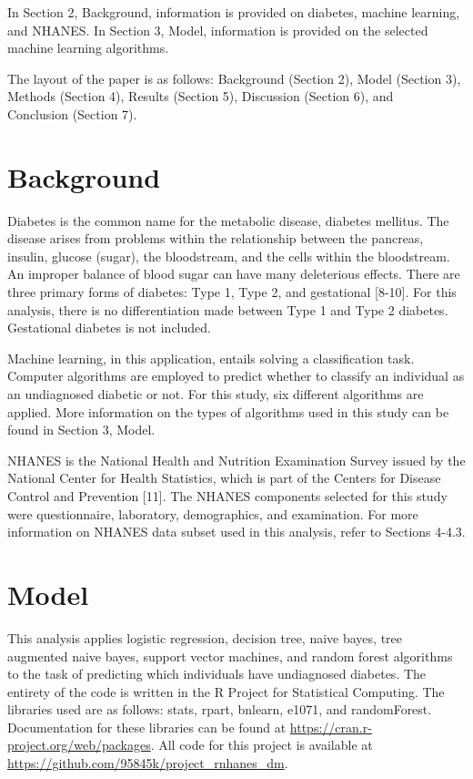 \documentclass[twoside,11pt]{article}
\begin{document}
In Section 2, Background, information is provided on diabetes, machine learning, and NHANES. In Section 3, Model, information is provided on the selected machine learning algorithms. 

The layout of the paper is as follows:
Background (Section 2), Model (Section 3), Methods (Section 4), Results (Section 5), Discussion (Section 6), and \\Conclusion (Section 7). 

\section{Background} \label{background}
Diabetes is the common name for the metabolic disease, diabetes mellitus. The disease arises from problems within the relationship between the pancreas, insulin, glucose (sugar), the bloodstream, and the cells within the bloodstream. An improper balance of blood sugar can have many deleterious effects. There are three primary forms of diabetes: Type 1, Type 2, and gestational [8-10]. For this analysis, there is no differentiation made between Type 1 and Type 2 diabetes. Gestational diabetes is not included. 

Machine learning, in this application, entails solving a classification task. Computer algorithms are employed to predict whether to classify an individual as an undiagnosed diabetic or not. For this study, six different algorithms are applied. More information on the types of algorithms used in this study can be found in Section 3, Model. 

NHANES is the National Health and Nutrition Examination Survey issued by the National Center for Health Statistics, which is part of the Centers for Disease Control and Prevention [11]. The NHANES components selected for this study were questionnaire, laboratory, demographics, and examination. For more information on NHANES data subset used in this analysis, refer to Sections 4-4.3. 

\section{Model} \label{model}
This analysis applies logistic regression, decision tree, naive bayes, tree augmented naive bayes, support vector machines, and random forest algorithms to the task of predicting which individuals have undiagnosed diabetes. The entirety of the code is written in the R Project for Statistical Computing. The libraries used are as follows: stats, rpart, bnlearn, e1071, and randomForest. Documentation for these libraries can be found at \url{https://cran.r-project.org/web/packages}. All code for this project is available at \url{https://github.com/95845k/project_rnhanes_dm}.
\end{document}
